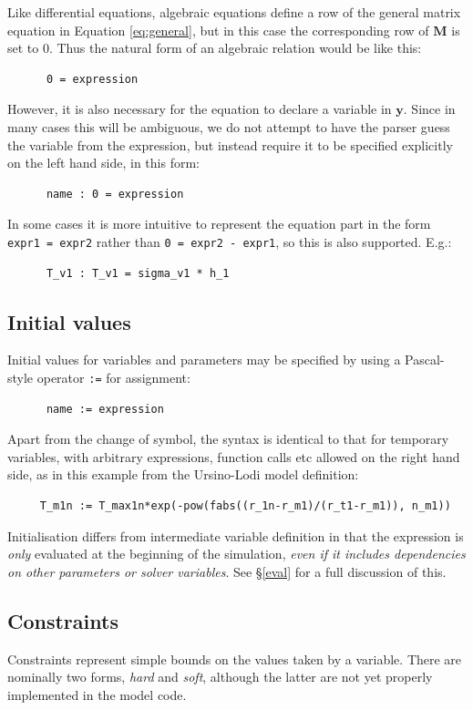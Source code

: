 \documentclass[a4paper,11pt]{article}
\newcommand{\vv}[1]{\mathbf{#1}}
\begin{document}
Like differential equations, algebraic equations define a row of the general matrix equation in Equation \ref{eq:general}, but in this case the corresponding row of $\vv{M}$ is set to 0. Thus the natural form of an algebraic relation would be like this:
\begin{verbatim}
      0 = expression
\end{verbatim}
However, it is also necessary for the equation to declare a variable in $\vv{y}$. Since in many cases this will be ambiguous, we do not attempt to have the parser guess the variable from the expression, but instead require it to be specified explicitly on the left hand side, in this form:
\begin{verbatim}
      name : 0 = expression
\end{verbatim}
In some cases it is more intuitive to represent the equation part in the form \texttt{expr1 = expr2} rather than \texttt{0 = expr2 - expr1}, so this is also supported. E.g.:
\begin{verbatim}
      T_v1 : T_v1 = sigma_v1 * h_1
\end{verbatim}

\subsection{Initial values}\label{inits}

Initial values for variables and parameters may be specified by using a Pascal-style operator \texttt{:=} for assignment:
\begin{verbatim}
      name := expression
\end{verbatim}
Apart from the change of symbol, the syntax is identical to that for temporary variables, with arbitrary expressions, function calls etc allowed on the right hand side, as in this example from the Ursino-Lodi model definition:
\begin{verbatim}
     T_m1n := T_max1n*exp(-pow(fabs((r_1n-r_m1)/(r_t1-r_m1)), n_m1))
\end{verbatim}
Initialisation differs from intermediate variable definition in that the expression is \textit{only} evaluated at the beginning of the simulation, \textit{even if it includes dependencies on other parameters or solver variables}. See \S\ref{eval} for a full discussion of this.

\subsection{Constraints}\label{constraints}
Constraints represent simple bounds on the values taken by a variable. There are nominally two forms, \textit{hard} and \textit{soft}, although the latter are not yet properly implemented in the model code.
\end{document}
